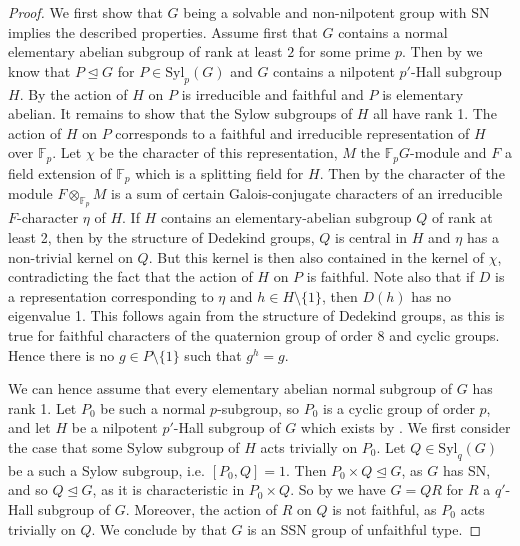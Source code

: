 \documentclass[a4paper,10pt]{amsart}
\theoremstyle{definition}
\theoremstyle{remark}
\begin{document}
\begin{proof}
We first show that $G$ being a solvable and non-nilpotent group with SN implies the described properties. 
Assume first that $G$ contains a normal elementary abelian subgroup of rank at least $2$ for some prime $p$. Then by  we know that $P \unlhd G$ for $P \in \text{Syl}_p(G)$ and $G$ contains a nilpotent $p'$-Hall subgroup $H$. By  the action of $H$ on $P$ is irreducible and faithful and $P$ is elementary abelian. It remains to show that the Sylow subgroups of $H$ all have rank 1. The action of $H$ on $P$ corresponds to a faithful and irreducible representation of $H$ over $\mathbb{F}_p$. Let $\chi$ be the character of this representation, $M$ the $\mathbb{F}_pG$-module and $F$ a field extension of $\mathbb{F}_p$ which is a splitting field for $H$. Then by \cite[Theorem 9.21]{Isaacs} the character of the module $F \otimes_{\mathbb{F}_p} M$ is a sum of certain Galois-conjugate characters of an irreducible $F$-character $\eta$ of $H$. If $H$ contains an elementary-abelian subgroup $Q$ of rank at least 2, then by the structure of Dedekind groups, $Q$ is central in $H$ and $\eta$ has a non-trivial kernel on $Q$. But this kernel is then also contained in the kernel of $\chi$, contradicting the fact that the action of $H$ on $P$ is faithful. Note also that if $D$ is a representation corresponding to $\eta$ and $h \in H \setminus \{ 1 \}$, then $D(h)$ has no eigenvalue 1. This follows again from the structure of Dedekind groups, as this is true for faithful characters of the quaternion group of order $8$ and cyclic groups. Hence there is no $g \in P \setminus \{1\}$ such that $g^h = g$.

We can hence assume that every elementary abelian normal subgroup of $G$ has rank 1. Let $P_0$ be such a normal $p$-subgroup, so $P_0$ is a cyclic group of order $p$, and let $H$ be a nilpotent $p'$-Hall subgroup of $G$ which exists by . We first consider the case that some Sylow subgroup of $H$ acts trivially on $P_0$. Let $Q \in \text{Syl}_q(G)$ be a such a Sylow subgroup, i.e. $[P_0, Q] = 1$. Then $P_0 \times Q \unlhd G$, as $G$ has SN, and so $Q \unlhd G$, as it is characteristic in $P_0 \times Q$. So by  we have $G = QR$ for $R$ a $q'$-Hall subgroup of $G$. Moreover, the action of $R$ on $Q$ is not faithful, as $P_0$ acts trivially on $Q$. We conclude by  that $G$ is an SSN group of unfaithful type.


\end{proof}
\end{document}
